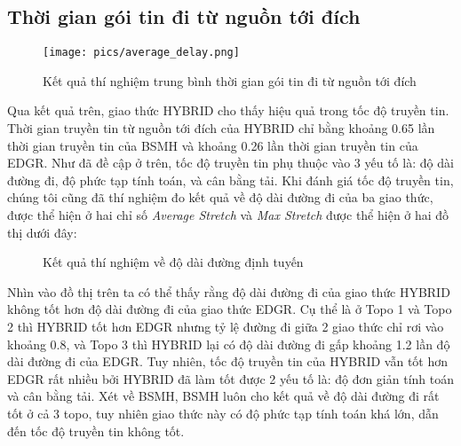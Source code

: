 \documentclass[12pt]{report}
\begin{document}
\subsection{Thời gian gói tin đi từ nguồn tới đích}
\begin{figure}[H]
\centering
\texttt{[image: pics/average\_delay.png]}
\caption{Kết quả thí nghiệm trung bình thời gian gói tin đi từ nguồn tới đích}
\end{figure}
Qua kết quả trên, giao thức HYBRID cho thấy hiệu quả trong tốc độ truyền tin. Thời gian truyền tin từ nguồn tới đích của HYBRID chỉ bằng khoảng 0.65 lần thời gian truyền tin của BSMH và khoảng 0.26 lần thời gian truyền tin của EDGR. Như đã đề cập ở trên, tốc độ truyền tin phụ thuộc vào 3 yếu tố là: độ dài đường đi, độ phức tạp tính toán, và cân bằng tải. Khi đánh giá tốc độ truyền tin, chúng tôi cũng đã thí nghiệm đo kết quả về độ dài đường đi của ba giao thức, được thể hiện ở hai chỉ số \textit{Average Stretch} và \textit{Max Stretch} được thể hiện ở hai đồ thị dưới đây:
\begin{figure}[H]
\centering
{}
\caption{Kết quả thí nghiệm về độ dài đường định tuyến}
\end{figure}
Nhìn vào đồ thị trên ta có thể thấy rằng độ dài đường đi của giao thức HYBRID không tốt hơn độ dài đường đi của giao thức EDGR. Cụ thể là ở Topo 1 và Topo 2 thì HYBRID tốt hơn EDGR nhưng tỷ lệ đường đi giữa 2 giao thức chỉ rơi vào khoảng 0.8, và Topo 3 thì HYBRID lại có độ dài đường đi gấp khoảng 1.2 lần độ dài đường đi của EDGR. Tuy nhiên, tốc độ truyền tin của HYBRID vẫn tốt hơn EDGR rất nhiều bởi HYBRID đã làm tốt được 2 yếu tố là: độ đơn giản tính toán và cân bằng tải. Xét về BSMH, BSMH luôn cho kết quả về độ dài đường đi rất tốt ở cả 3 topo, tuy nhiên giao thức này có độ phức tạp tính toán khá lớn, dẫn đến tốc độ truyền tin không tốt.
\end{document}
